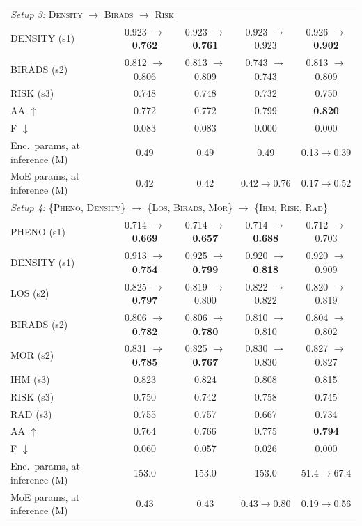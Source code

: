 \begin{table}[t]
\begin{tabular}{lcccc}
\midrule
\multicolumn{5}{l}{\emph{Setup 3:} \textsc{Density} $\to$ \textsc{Birads} $\to$ \textsc{Risk}} \\
\addlinespace[1pt]
DENSITY (s1) & 0.923 $\to$ \textbf{0.762} & 0.923 $\to$ \textbf{0.761} & 0.923 $\to$ 0.923 & 0.926 $\to$ \textbf{0.902} \\
BIRADS (s2) & 0.812 $\to$ 0.806 & 0.813 $\to$ 0.809 & 0.743 $\to$ 0.743 & 0.813 $\to$ 0.809 \\
RISK (s3) & 0.748 & 0.748 & 0.732 & 0.750 \\
\addlinespace[1pt]
AA $\uparrow$ & 0.772 & 0.772 & 0.799 & \textbf{0.820} \\
F $\downarrow$ & 0.083 & 0.083 & 0.000 & 0.000 \\
Enc.\ params, at inference (M) & 0.49 & 0.49 & 0.49 & 0.13$\to$0.39 \\
MoE params, at inference (M) & 0.42 & 0.42 & 0.42$\to$0.76 & 0.17$\to$0.52 \\
\midrule
\multicolumn{5}{l}{\emph{Setup 4:} \{\textsc{Pheno}, \textsc{Density}\} $\to$ \{\textsc{Los}, \textsc{Birads}, \textsc{Mor}\} $\to$ \{\textsc{Ihm}, \textsc{Risk}, \textsc{Rad}\}} \\
\addlinespace[1pt]
PHENO (s1) & 0.714 $\to$ \textbf{0.669} & 0.714 $\to$ \textbf{0.657} & 0.714 $\to$ \textbf{0.688} & 0.712 $\to$ 0.703 \\
DENSITY (s1) & 0.913 $\to$ \textbf{0.754} & 0.925 $\to$ \textbf{0.799} & 0.920 $\to$ \textbf{0.818} & 0.920 $\to$ 0.909 \\
LOS (s2) & 0.825 $\to$ \textbf{0.797} & 0.819 $\to$ 0.800 & 0.822 $\to$ 0.822 & 0.820 $\to$ 0.819 \\
BIRADS (s2) & 0.806 $\to$ \textbf{0.782} & 0.806 $\to$ \textbf{0.780} & 0.810 $\to$ 0.810 & 0.804 $\to$ 0.802 \\
MOR (s2) & 0.831 $\to$ \textbf{0.785} & 0.825 $\to$ \textbf{0.767} & 0.830 $\to$ 0.830 & 0.827 $\to$ 0.827 \\
IHM (s3) & 0.823 & 0.824 & 0.808 & 0.815 \\
RISK (s3) & 0.750 & 0.742 & 0.758 & 0.745 \\
RAD (s3) & 0.755 & 0.757 & 0.667 & 0.734 \\
\addlinespace[1pt]
AA $\uparrow$ & 0.764 & 0.766 & 0.775 & \textbf{0.794} \\
F $\downarrow$ & 0.060 & 0.057 & 0.026 & 0.000 \\
Enc.\ params, at inference (M) & 153.0 & 153.0 & 153.0 & 51.4$\to$67.4 \\
MoE params, at inference (M) & 0.43 & 0.43 & 0.43$\to$0.80 & 0.19$\to$0.56 \\
\bottomrule
\end{tabular}
\end{table}
